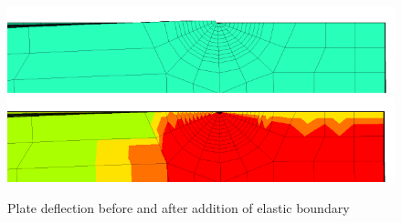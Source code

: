 \begin{frame}
\begin{figure}[tbp]
\centering
\includegraphics[width=0.9\columnwidth]{left-step-30-10x-zoomed-before.png}
\includegraphics[width=0.9\columnwidth]{left-step-30-10x-zoomed-after.png}
\caption{Plate deflection before and after addition of elastic boundary}
\end{figure}
\note{
\vfill
}
\end{frame}

